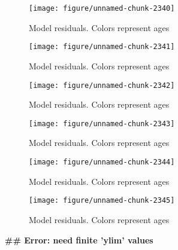 \documentclass[a4paper]{article}\usepackage{graphicx, color}
\makeatletter
\def\maxwidth{ %
  \ifdim\Gin@nat@width>\linewidth
    \linewidth
  \else
    \Gin@nat@width
  \fi
}
\newenvironment{kframe}{%
 \def\at@end@of@kframe{}%
 \ifinner\ifhmode%
  \def\at@end@of@kframe{\end{minipage}}%
  \begin{minipage}{\columnwidth}%
 \fi\fi%
 \def\FrameCommand##1{\hskip\@totalleftmargin \hskip-\fboxsep
 \colorbox{shadecolor}{##1}\hskip-\fboxsep
     \hskip-\linewidth \hskip-\@totalleftmargin \hskip\columnwidth}%
 \MakeFramed {\advance\hsize-\width
   \@totalleftmargin\z@ \linewidth\hsize
   \@setminipage}}%
 {\par\unskip\endMakeFramed%
 \at@end@of@kframe}
\newenvironment{knitrout}{}{} %
\makeatother
\begin{document}
\begin{knitrout}
\begin{figure}[H]
{\centering \texttt{[image: figure/unnamed-chunk-2340]} 

}

\caption[Model residuals]{Model residuals. Colors represent ages\label{fig:unnamed-chunk-2340}}
\end{figure}
\begin{figure}[H]


{\centering \texttt{[image: figure/unnamed-chunk-2341]} 

}

\caption[Model residuals]{Model residuals. Colors represent ages\label{fig:unnamed-chunk-2341}}
\end{figure}
\begin{figure}[H]


{\centering \texttt{[image: figure/unnamed-chunk-2342]} 

}

\caption[Model residuals]{Model residuals. Colors represent ages\label{fig:unnamed-chunk-2342}}
\end{figure}
\begin{figure}[H]


{\centering \texttt{[image: figure/unnamed-chunk-2343]} 

}

\caption[Model residuals]{Model residuals. Colors represent ages\label{fig:unnamed-chunk-2343}}
\end{figure}
\begin{figure}[H]


{\centering \texttt{[image: figure/unnamed-chunk-2344]} 

}

\caption[Model residuals]{Model residuals. Colors represent ages\label{fig:unnamed-chunk-2344}}
\end{figure}
\begin{figure}[H]


{\centering \texttt{[image: figure/unnamed-chunk-2345]} 

}

\caption[Model residuals]{Model residuals. Colors represent ages\label{fig:unnamed-chunk-2345}}
\end{figure}
\begin{kframe}

{\ttfamily\noindent\bfseries\textcolor{errorcolor}{\#\# Error: need finite 'ylim' values}}\end{kframe}
\end{knitrout}
\end{document}
